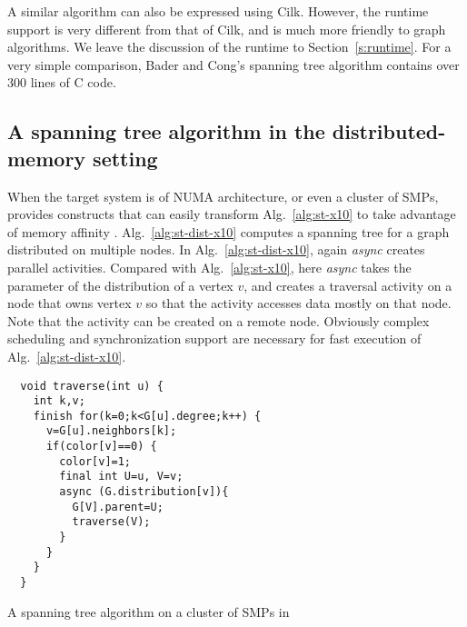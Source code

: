 A similar algorithm can also be expressed using Cilk. However, the \Xten{} runtime support is very different from that of Cilk, and is much more friendly to graph algorithms. We leave the discussion of the \Xten{} runtime to Section~\ref{s:runtime}. For a very simple comparison, Bader and Cong's spanning tree algorithm contains over 300 lines of C code.


\subsection{A spanning tree algorithm in the distributed-memory setting}
\label{s:trav-dist}

 When the target system is of NUMA architecture, or even a cluster of SMPs, \Xten{} provides constructs that can easily transform Alg.~\ref{alg:st-x10} to take advantage of memory affinity . Alg.~\ref{alg:st-dist-x10} computes a spanning tree for a graph distributed on multiple nodes. In Alg.~\ref{alg:st-dist-x10}, again \emph{async} creates parallel activities. Compared with Alg.~\ref{alg:st-x10}, here \emph{async} takes the parameter of the distribution of a vertex $v$, and creates a traversal activity on a node that owns vertex $v$ so that the activity accesses data mostly on that node. Note that the activity can be created on a remote node. Obviously complex scheduling and synchronization support are necessary for fast execution of Alg.~\ref{alg:st-dist-x10}.

\begin{algorithm}
\centering
\scriptsize
\begin{minipage}{0.5\textwidth}
\begin{verbatim} 
  void traverse(int u) {
    int k,v;
    finish for(k=0;k<G[u].degree;k++) {
      v=G[u].neighbors[k];
      if(color[v]==0) {
        color[v]=1;
        final int U=u, V=v;
        async (G.distribution[v]){
          G[V].parent=U;
          traverse(V);
        }
      }
    }
  }
\end{verbatim}
\end{minipage}
\caption{A spanning tree algorithm on a cluster of SMPs in \Xten{}}
\label{alg:st-dist-x10}
\end{algorithm}



